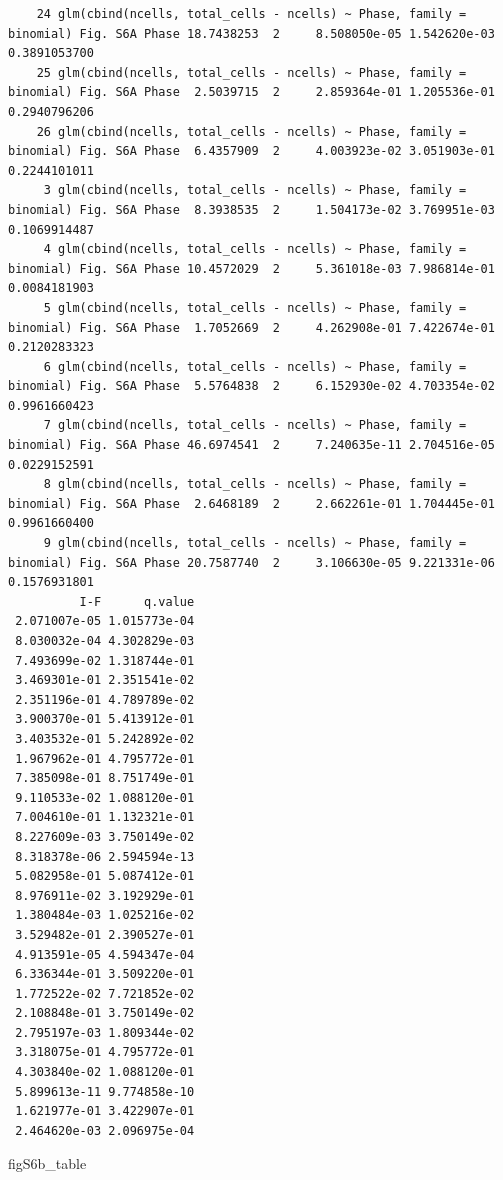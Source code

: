 \documentclass[
  landscape]{article}
\newenvironment{Shaded}{\begin{snugshade}}{\end{snugshade}}
\newcommand{\NormalTok}[1]{#1}
\begin{document}
\begin{verbatim}
    24 glm(cbind(ncells, total_cells - ncells) ~ Phase, family = binomial) Fig. S6A Phase 18.7438253  2     8.508050e-05 1.542620e-03 0.3891053700
    25 glm(cbind(ncells, total_cells - ncells) ~ Phase, family = binomial) Fig. S6A Phase  2.5039715  2     2.859364e-01 1.205536e-01 0.2940796206
    26 glm(cbind(ncells, total_cells - ncells) ~ Phase, family = binomial) Fig. S6A Phase  6.4357909  2     4.003923e-02 3.051903e-01 0.2244101011
     3 glm(cbind(ncells, total_cells - ncells) ~ Phase, family = binomial) Fig. S6A Phase  8.3938535  2     1.504173e-02 3.769951e-03 0.1069914487
     4 glm(cbind(ncells, total_cells - ncells) ~ Phase, family = binomial) Fig. S6A Phase 10.4572029  2     5.361018e-03 7.986814e-01 0.0084181903
     5 glm(cbind(ncells, total_cells - ncells) ~ Phase, family = binomial) Fig. S6A Phase  1.7052669  2     4.262908e-01 7.422674e-01 0.2120283323
     6 glm(cbind(ncells, total_cells - ncells) ~ Phase, family = binomial) Fig. S6A Phase  5.5764838  2     6.152930e-02 4.703354e-02 0.9961660423
     7 glm(cbind(ncells, total_cells - ncells) ~ Phase, family = binomial) Fig. S6A Phase 46.6974541  2     7.240635e-11 2.704516e-05 0.0229152591
     8 glm(cbind(ncells, total_cells - ncells) ~ Phase, family = binomial) Fig. S6A Phase  2.6468189  2     2.662261e-01 1.704445e-01 0.9961660400
     9 glm(cbind(ncells, total_cells - ncells) ~ Phase, family = binomial) Fig. S6A Phase 20.7587740  2     3.106630e-05 9.221331e-06 0.1576931801
          I-F      q.value
 2.071007e-05 1.015773e-04
 8.030032e-04 4.302829e-03
 7.493699e-02 1.318744e-01
 3.469301e-01 2.351541e-02
 2.351196e-01 4.789789e-02
 3.900370e-01 5.413912e-01
 3.403532e-01 5.242892e-02
 1.967962e-01 4.795772e-01
 7.385098e-01 8.751749e-01
 9.110533e-02 1.088120e-01
 7.004610e-01 1.132321e-01
 8.227609e-03 3.750149e-02
 8.318378e-06 2.594594e-13
 5.082958e-01 5.087412e-01
 8.976911e-02 3.192929e-01
 1.380484e-03 1.025216e-02
 3.529482e-01 2.390527e-01
 4.913591e-05 4.594347e-04
 6.336344e-01 3.509220e-01
 1.772522e-02 7.721852e-02
 2.108848e-01 3.750149e-02
 2.795197e-03 1.809344e-02
 3.318075e-01 4.795772e-01
 4.303840e-02 1.088120e-01
 5.899613e-11 9.774858e-10
 1.621977e-01 3.422907e-01
 2.464620e-03 2.096975e-04
\end{verbatim}

\begin{Shaded}
\begin{Highlighting}[]
\NormalTok{figS6b\_table}
\end{Highlighting}
\end{Shaded}
\end{document}
